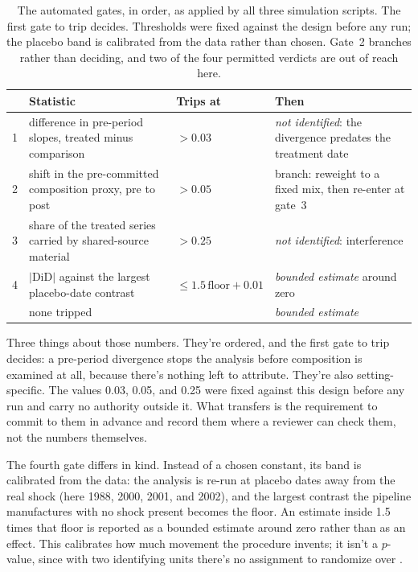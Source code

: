 \begin{table}[!ht]
\centering
\footnotesize
\caption{The automated gates, in order, as applied by all three simulation scripts. The first gate to trip decides. Thresholds were fixed against the design before any run; the placebo band is calibrated from the data rather than chosen. Gate~2 branches rather than deciding, and two of the four permitted verdicts are out of reach here.}
\label{tab:gates}
\begin{tabular}{@{}l p{} l p{}@{}}
\toprule
& \textbf{Statistic} & \textbf{Trips at} & \textbf{Then} \\
\midrule
1 & difference in pre-period slopes, treated minus comparison & $>0.03$ & \emph{not identified}: the divergence predates the treatment date \\
2 & shift in the pre-committed composition proxy, pre to post & $>0.05$ & branch: reweight to a fixed mix, then re-enter at gate~3 \\
3 & share of the treated series carried by shared-source material & $>0.25$ & \emph{not identified}: interference \\
4 & $|\mathrm{DiD}|$ against the largest placebo-date contrast & $\leq 1.5\,\text{floor} + 0.01$ & \emph{bounded estimate} around zero \\
\midrule
& none tripped & & \emph{bounded estimate} \\
\bottomrule
\end{tabular}
\end{table}

Three things about those numbers. They're ordered, and the first gate to trip decides: a pre-period divergence stops the analysis before composition is examined at all, because there's nothing left to attribute. They're also setting-specific. The values 0.03, 0.05, and 0.25 were fixed against this design before any run and carry no authority outside it. What transfers is the requirement to commit to them in advance and record them where a reviewer can check them, not the numbers themselves.

The fourth gate differs in kind. Instead of a chosen constant, its band is calibrated from the data: the analysis is re-run at placebo dates away from the real shock (here 1988, 2000, 2001, and 2002), and the largest contrast the pipeline manufactures with no shock present becomes the floor. An estimate inside 1.5 times that floor is reported as a bounded estimate around zero rather than as an effect. This calibrates how much movement the procedure invents; it isn't a $p$-value, since with two identifying units there's no assignment to randomize over \citep{BertrandDufloMullainathan2004}.

